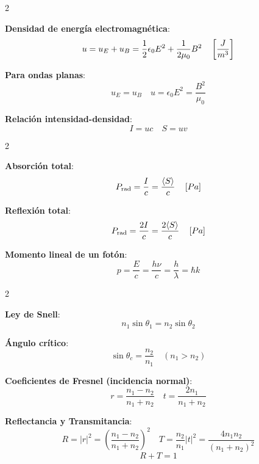 \documentclass{article}
\begin{document}
\begin{multicols}{2}
\begin{itemform}
\item \textbf{Densidad de energía electromagnética}:
$$u = u_E + u_B = \frac{1}{2}\epsilon_0 E^2 + \frac{1}{2\mu_0}B^2 \quad \left[\frac{J}{m^3} \right]$$

\item \textbf{Para ondas planas}:
$$u_E = u_B \quad u = \epsilon_0 E^2 = \frac{B^2}{\mu_0}$$

\item \textbf{Relación intensidad-densidad}:
$$I = uc \quad S = u v$$
\end{itemform}
\columnbreak
{}

\begin{multicols}{2}
\begin{itemform}
\item \textbf{Absorción total}:
$$P_{\text{rad}} = \frac{I}{c} = \frac{\langle S \rangle}{c} \quad \left[Pa \right]$$

\columnbreak
\item \textbf{Reflexión total}:
$$P_{\text{rad}} = \frac{2I}{c} = \frac{2\langle S \rangle}{c} \quad \left[Pa \right]$$
\end{itemform}
\end{multicols}

\begin{itemform}
\item \textbf{Momento lineal de un fotón}:
$$p = \frac{E}{c} = \frac{h\nu}{c} = \frac{h}{\lambda} = \hbar k$$
\end{itemform}


\begin{multicols}{2}
\begin{itemform}
\item \textbf{Ley de Snell}:
$$n_1\sin\theta_1 = n_2\sin\theta_2$$

\columnbreak
\item \textbf{Ángulo crítico}:
$$\sin\theta_c = \frac{n_2}{n_1} \quad (n_1 > n_2)$$
\end{itemform}
\end{multicols}

\begin{itemform}
\item \textbf{Coeficientes de Fresnel (incidencia normal)}:
$$r = \frac{n_1 - n_2}{n_1 + n_2} \quad t = \frac{2n_1}{n_1 + n_2}$$

\item \textbf{Reflectancia y Transmitancia}:
$$R = |r|^2 = \left(\frac{n_1-n_2}{n_1+n_2}\right)^2 \quad T = \frac{n_2}{n_1}|t|^2 = \frac{4n_1n_2}{(n_1+n_2)^2}$$
$$R + T = 1$$


\end{itemform}
\end{multicols}
\end{document}
